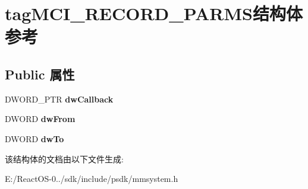 \hypertarget{structtag_m_c_i___r_e_c_o_r_d___p_a_r_m_s}{}\section{tag\+M\+C\+I\+\_\+\+R\+E\+C\+O\+R\+D\+\_\+\+P\+A\+R\+M\+S结构体 参考}
\label{structtag_m_c_i___r_e_c_o_r_d___p_a_r_m_s}
\subsection*{Public 属性}
\begin{DoxyCompactItemize}
\item 
\mbox{\label{structtag_m_c_i___r_e_c_o_r_d___p_a_r_m_s_a0024e01f44fe08eabafbfc8d0360b33f}} 
D\+W\+O\+R\+D\+\_\+\+P\+TR {\bfseries dw\+Callback}
\item 
\mbox{\label{structtag_m_c_i___r_e_c_o_r_d___p_a_r_m_s_a9af1b0d2562735597b5c03cf7ca894ea}} 
D\+W\+O\+RD {\bfseries dw\+From}
\item 
\mbox{\label{structtag_m_c_i___r_e_c_o_r_d___p_a_r_m_s_a8500f7abba910936e1949cd08bab9ae5}} 
D\+W\+O\+RD {\bfseries dw\+To}
\end{DoxyCompactItemize}


该结构体的文档由以下文件生成\+:\begin{DoxyCompactItemize}
\item 
E\+:/\+React\+O\+S-\/0../sdk/include/psdk/mmsystem.\+h\end{DoxyCompactItemize}
